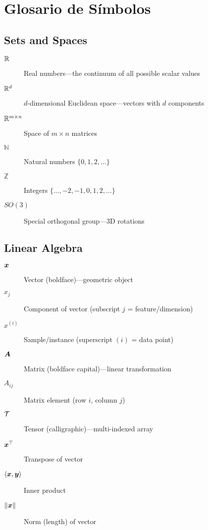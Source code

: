 \chapter*{Glosario de Símbolos}

\section*{Sets and Spaces}

\begin{description}
    \item[$\mathbb{R}$] Real numbers---the continuum of all possible scalar values
    \item[$\mathbb{R}^d$] $d$-dimensional Euclidean space---vectors with $d$ components
    \item[$\mathbb{R}^{m \times n}$] Space of $m \times n$ matrices
    \item[$\mathbb{N}$] Natural numbers $\{0, 1, 2, \ldots\}$
    \item[$\mathbb{Z}$] Integers $\{\ldots, -2, -1, 0, 1, 2, \ldots\}$
    \item[$SO(3)$] Special orthogonal group---3D rotations
\end{description}

\section*{Linear Algebra}

\begin{description}
    \item[$\bm{x}$] Vector (boldface)---geometric object
    \item[$x_j$] Component of vector (subscript $j$ = feature/dimension)
    \item[$x^{(i)}$] Sample/instance (superscript $(i)$ = data point)
    \item[$\bm{A}$] Matrix (boldface capital)---linear transformation
    \item[$A_{ij}$] Matrix element (row $i$, column $j$)
    \item[$\mathcal{T}$] Tensor (calligraphic)---multi-indexed array
    \item[$\bm{x}^\top$] Transpose of vector
    \item[$\langle \bm{x}, \bm{y} \rangle$] Inner product
    \item[$\|\bm{x}\|$] Norm (length) of vector
\end{description}

